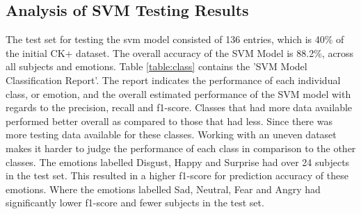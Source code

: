 \subsection{Analysis of SVM Testing Results}\label{sec:svm}
The test set for testing the svm model consisted of 136 entries, which is 40\% of the initial CK+ dataset. The overall accuracy of the SVM Model is 88.2\%, across all subjects and emotions. Table \ref{table:class} contains the 'SVM Model Classification Report'. The report indicates the performance of each individual class, or emotion, and the overall estimated performance of the SVM model with regards to the precision, recall and f1-score. Classes that had more data available performed better overall as compared to those that had less. Since there was more testing data available for these classes. Working with an uneven dataset makes it harder to judge the performance of each class in comparison to the other classes. 
The emotions labelled Disgust, Happy and Surprise had over 24 subjects in the test set. This resulted in a higher f1-score for prediction accuracy of these emotions. Where the emotions labelled Sad, Neutral, Fear and Angry had significantly lower f1-score and fewer subjects in the test set. 
\begin{table}[H]
\centering
{}
\caption{SVM Classification Report}
\label{table:class}
\end{table}
